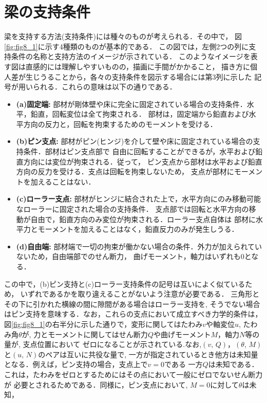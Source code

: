 \documentclass[10pt,a4j]{jbook}
\begin{document}
\section{梁の支持条件}
梁を支持する方法(支持条件)には種々のものが考えられる．その中で，
図\ref{fig:fig8_1}に示す4種類のものが基本的である．
この図では，左側2つの列に支持条件の名称と支持方法のイメージが示されている．
このようなイメージを表す図は直感的には理解しやすいものの，描画に手間がかかること，
描き方に個人差が生じうることから，各々の支持条件を図示する場合には第3列に示した
記号が用いられる．これらの意味は以下の通りである．
\begin{itemize}
\item
	{\bf (a)固定端:}
	部材が剛体壁や床に完全に固定されている場合の支持条件．水平，鉛直，回転変位は全て拘束される．
	部材は，固定端から鉛直および水平方向の反力と，回転を拘束するためのモーメントを受ける．
\item
	{\bf (b)ピン支点:}
	部材がピン(ヒンジ)を介して壁や床に固定されている場合の支持条件．部材はピン支点部で
	自由に回転することができるが，水平および鉛直方向には変位が拘束される．従って，
	ピン支点から部材は水平および鉛直方向の反力を受ける．支点は回転を拘束しないため，
	支点が部材にモーメントを加えることはない．
\item
	{\bf (c)ローラー支点:}
	部材がヒンジに結合された上で，水平方向にのみ移動可能なローラーに固定された場合の支持条件．
	支点部では回転と水平方向の移動が自由で，鉛直方向のみ変位が拘束される．ローラー支点自体は
	部材に水平力とモーメントを加えることはなく，鉛直反力のみが発生しうる．
\item
	{\bf (d)自由端:}
	部材端で一切の拘束が働かない場合の条件．外力が加えられていないため，自由端部でのせん断力，
	曲げモーメント，軸力はいずれも0となる．
\end{itemize}
この中で，(b)ピン支持と(c)ローラー支持条件の記号は互いによく似ているため，
いずれであるかを取り違えることがないよう注意が必要である．
三角形とその下に引かれた横線の間に隙間がある場合はローラー支持を, そうでない場合
はピン支持を意味する．なお，これらの支点において成立すべき力学的条件は，
図\ref{fig:fig8_1}の右半分に示した通りで，変形に関してはたわみ$v$や軸変位$u$, たわみ角$\theta$が, 
力とモーメントに関してはせん断力$Q$や曲げモーメント$M$，軸力$N$等の量が, 支点位置において
ゼロになることが示されている.なお,$(v,\,Q)$，$(\theta,\, M)$と$(u,\, N)$のペアは互いに共役な量で,
一方が指定されているとき他方は未知量となる．例えば，ピン支持の場合，支点上で$v=0$である
一方$Q$は未知である．これは，たわみをゼロとするためにはその点において一般にゼロでないせん断力が
必要とされるためである．同様に，ピン支点において, $M=0$に対して$\theta$は未知，
\end{document}
